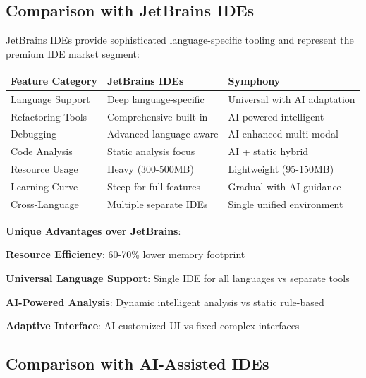 \subsection*{Comparison with JetBrains IDEs}

JetBrains IDEs provide sophisticated language-specific tooling and represent the premium IDE market segment:

\begin{center}
\begin{tabular}{@{}lll@{}}
\toprule
\textbf{Feature Category} & \textbf{JetBrains IDEs} & \textbf{Symphony} \\
\midrule
Language Support & Deep language-specific & Universal with AI adaptation \\
Refactoring Tools & Comprehensive built-in & AI-powered intelligent \\
Debugging & Advanced language-aware & AI-enhanced multi-modal \\
Code Analysis & Static analysis focus & AI + static hybrid \\
Resource Usage & Heavy (300-500MB) & Lightweight (95-150MB) \\
Learning Curve & Steep for full features & Gradual with AI guidance \\
Cross-Language & Multiple separate IDEs & Single unified environment \\
\bottomrule
\end{tabular}
\end{center}

\textbf{Unique Advantages over JetBrains}:
\begin{compactlist}
    \item \textbf{Resource Efficiency}: 60-70\% lower memory footprint
    \item \textbf{Universal Language Support}: Single IDE for all languages vs separate tools
    \item \textbf{AI-Powered Analysis}: Dynamic intelligent analysis vs static rule-based
    \item \textbf{Adaptive Interface}: AI-customized UI vs fixed complex interfaces
\end{compactlist}

\subsection*{Comparison with AI-Assisted IDEs}

